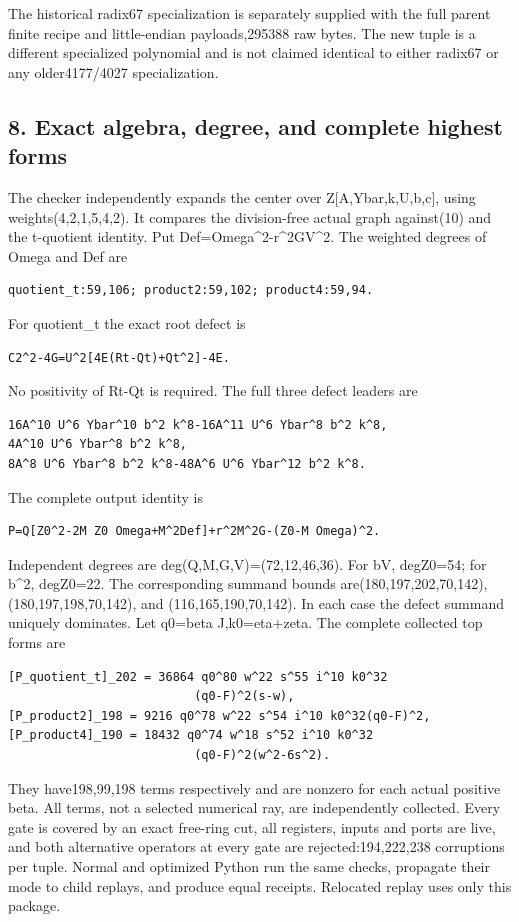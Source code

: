 The historical radix67 specialization is separately supplied with the
full parent finite recipe and little-endian payloads,295388 raw bytes.
The new tuple is a different specialized polynomial and is not claimed
identical to either radix67 or any older4177/4027 specialization.

\subsection{8. Exact algebra, degree, and complete highest
forms}\label{exact-algebra-degree-and-complete-highest-forms}

The checker independently expands the center over Z{[}A,Ybar,k,U,b,c{]},
using weights(4,2,1,5,4,2). It compares the division-free actual graph
against(10) and the t-quotient identity. Put
Def=Omega\^{}2-r\^{}2GV\^{}2. The weighted degrees of Omega and Def are

\begin{verbatim}
quotient_t:59,106; product2:59,102; product4:59,94.
\end{verbatim}

For quotient\_t the exact root defect is

\begin{verbatim}
C2^2-4G=U^2[4E(Rt-Qt)+Qt^2]-4E.
\end{verbatim}

No positivity of Rt-Qt is required. The full three defect leaders are

\begin{verbatim}
16A^10 U^6 Ybar^10 b^2 k^8-16A^11 U^6 Ybar^8 b^2 k^8,
4A^10 U^6 Ybar^8 b^2 k^8,
8A^8 U^6 Ybar^8 b^2 k^8-48A^6 U^6 Ybar^12 b^2 k^8.
\end{verbatim}

The complete output identity is

\begin{verbatim}
P=Q[Z0^2-2M Z0 Omega+M^2Def]+r^2M^2G-(Z0-M Omega)^2.
\end{verbatim}

Independent degrees are deg(Q,M,G,V)=(72,12,46,36). For bV, degZ0=54;
for b\^{}2, degZ0=22. The corresponding summand bounds
are(180,197,202,70,142),(180,197,198,70,142), and (116,165,190,70,142).
In each case the defect summand uniquely dominates. Let q0=beta
J,k0=eta+zeta. The complete collected top forms are

\begin{verbatim}
[P_quotient_t]_202 = 36864 q0^80 w^22 s^55 i^10 k0^32
                          (q0-F)^2(s-w),
[P_product2]_198 = 9216 q0^78 w^22 s^54 i^10 k0^32(q0-F)^2,
[P_product4]_190 = 18432 q0^74 w^18 s^52 i^10 k0^32
                          (q0-F)^2(w^2-6s^2).
\end{verbatim}

They have198,99,198 terms respectively and are nonzero for each actual
positive beta. All terms, not a selected numerical ray, are
independently collected. Every gate is covered by an exact free-ring
cut, all registers, inputs and ports are live, and both alternative
operators at every gate are rejected:194,222,238 corruptions per tuple.
Normal and optimized Python run the same checks, propagate their mode to
child replays, and produce equal receipts. Relocated replay uses only
this package.
